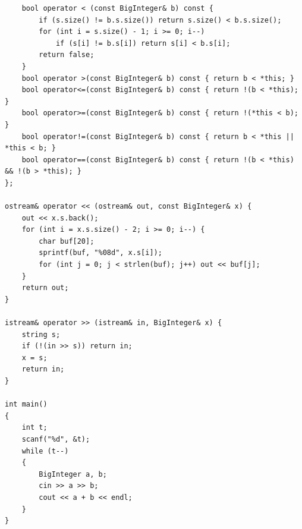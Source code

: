 \documentclass[twoside]{article}
\begin{document}
\begin{lstlisting}
    bool operator < (const BigInteger& b) const {
        if (s.size() != b.s.size()) return s.size() < b.s.size();
        for (int i = s.size() - 1; i >= 0; i--)
            if (s[i] != b.s[i]) return s[i] < b.s[i];
        return false;
    }
    bool operator >(const BigInteger& b) const { return b < *this; }
    bool operator<=(const BigInteger& b) const { return !(b < *this); }
    bool operator>=(const BigInteger& b) const { return !(*this < b); }
    bool operator!=(const BigInteger& b) const { return b < *this || *this < b; }
    bool operator==(const BigInteger& b) const { return !(b < *this) && !(b > *this); }
};

ostream& operator << (ostream& out, const BigInteger& x) {
    out << x.s.back();
    for (int i = x.s.size() - 2; i >= 0; i--) {
        char buf[20];
        sprintf(buf, "%08d", x.s[i]);
        for (int j = 0; j < strlen(buf); j++) out << buf[j];
    }
    return out;
}

istream& operator >> (istream& in, BigInteger& x) {
    string s;
    if (!(in >> s)) return in;
    x = s;
    return in;
}

int main()
{
    int t;
    scanf("%d", &t);
    while (t--)
    {
        BigInteger a, b;
        cin >> a >> b;
        cout << a + b << endl;
    }
}
\end{lstlisting}
\end{document}
